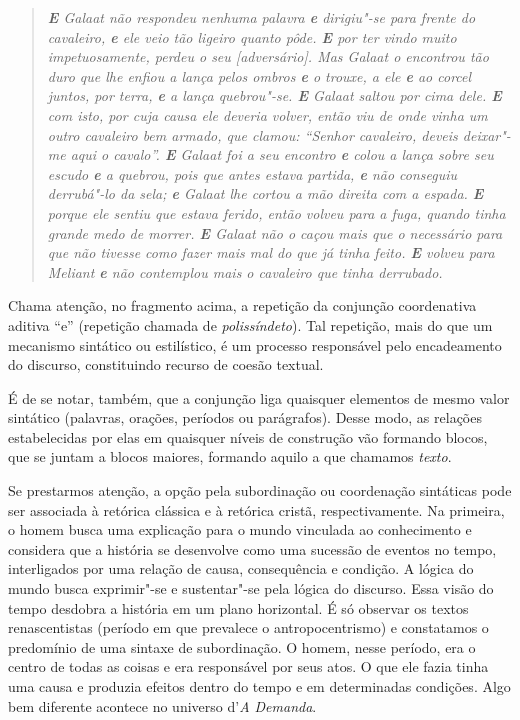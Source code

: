 \documentclass{extarticle}
\begin{document}
\begin{quote}
\emph{\textbf{E} Galaat não respondeu nenhuma palavra \textbf{e}
dirigiu"-se para frente do cavaleiro, \textbf{e} ele veio tão ligeiro
quanto pôde. \textbf{E} por ter vindo muito impetuosamente, perdeu o seu
{[}adversário{]}. Mas Galaat o encontrou tão duro que lhe enfiou a lança
pelos ombros \textbf{e} o trouxe, a ele \textbf{e} ao corcel juntos, por
terra, \textbf{e} a lança quebrou"-se. \textbf{E} Galaat saltou por cima
dele. \textbf{E} com isto, por cuja causa ele deveria volver, então viu
de onde vinha um outro cavaleiro bem armado, que clamou: ``Senhor
cavaleiro, deveis deixar"-me aqui o cavalo''. \textbf{E} Galaat foi a seu
encontro \textbf{e} colou a lança sobre seu escudo \textbf{e} a quebrou,
pois que antes estava partida, \textbf{e} não conseguiu derrubá"-lo da
sela; \textbf{e} Galaat lhe cortou a mão direita com a espada.
\textbf{E} porque ele sentiu que estava ferido, então volveu para a
fuga, quando tinha grande medo de morrer. \textbf{E} Galaat não o caçou
mais que o necessário para que não tivesse como fazer mais mal do que já
tinha feito. \textbf{E} volveu para Meliant \textbf{e} não contemplou
mais o cavaleiro que tinha derrubado. }
\end{quote}

Chama atenção, no fragmento acima, a repetição
da conjunção coordenativa aditiva ``e'' (repetição chamada de
\emph{polissíndeto}). Tal repetição, mais do que um mecanismo sintático
ou estilístico, é um processo responsável pelo encadeamento do discurso,
constituindo recurso de coesão textual.

É de se notar, também, que a conjunção liga
quaisquer elementos de mesmo valor sintático (palavras, orações,
períodos ou parágrafos). Desse modo, as relações estabelecidas por elas
em quaisquer níveis de construção vão formando blocos, que se juntam a
blocos maiores, formando aquilo a que chamamos
\emph{texto}.

Se prestarmos atenção, a opção pela
subordinação ou coordenação sintáticas pode ser associada à retórica
clássica e à retórica cristã, respectivamente. Na primeira, o homem
busca uma explicação para o mundo vinculada ao conhecimento e considera
que a história se desenvolve como uma sucessão de eventos no tempo,
interligados por uma relação de causa, consequência e condição. A lógica
do mundo busca exprimir"-se e sustentar"-se pela lógica do discurso. Essa
visão do tempo desdobra a história em um plano horizontal. É só observar
os textos renascentistas (período em que prevalece o antropocentrismo) e
constatamos o predomínio de uma sintaxe de subordinação. O homem, nesse
período, era o centro de todas as coisas e era responsável por seus
atos. O que ele fazia tinha uma causa e produzia efeitos dentro do tempo
e em determinadas condições. Algo bem diferente acontece no universo
d'\emph{A Demanda}.
\end{document}
